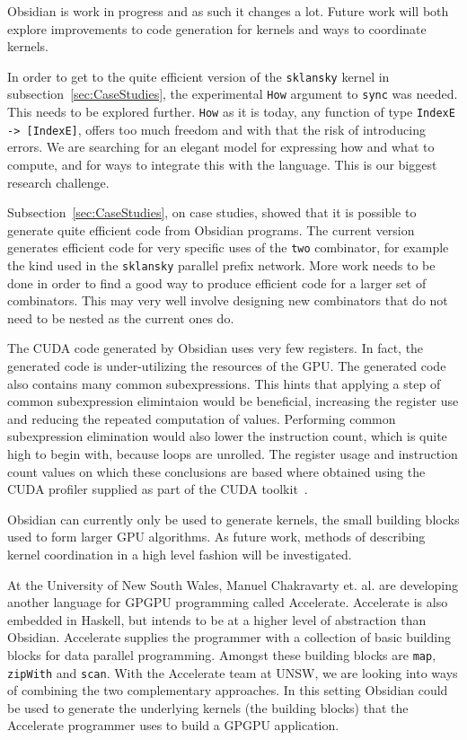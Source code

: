 Obsidian is work in progress and as such it changes a lot. Future work will both
explore improvements to code generation for kernels and ways to coordinate kernels.

In order to get to the quite efficient version of the {\tt sklansky} kernel 
in subsection~\ref{sec:CaseStudies}, the experimental {\tt How} argument to {\tt sync} was needed. 
This needs to be 
explored further. {\tt How} as it is today, any function of type
{\tt IndexE -> [IndexE]}, offers too much freedom and with that the risk of
introducing errors. We are searching for an elegant model for expressing how and what 
to compute, and for ways to integrate this with
the language. This is our biggest research challenge.

Subsection~\ref{sec:CaseStudies}, on case studies, showed that it is possible to
generate quite efficient code from Obsidian programs. The current version 
generates efficient code for very specific uses of the {\tt two} combinator, 
for example the kind used in the {\tt sklansky} parallel prefix network. More 
work needs to be done in order to find a good way to produce efficient code 
for a larger set of combinators. 
This may very well involve designing new combinators that do not need
to be nested as the current ones do.

The CUDA code generated by Obsidian uses very few registers. In fact,
the generated code is under-utilizing the resources of the GPU. The generated 
code also contains many common subexpressions. This hints that applying a 
step of common subexpression elimintaion would be beneficial, increasing 
the register use and reducing the repeated computation of values. Performing
common subexpression elimination would also lower the instruction count,
which is quite high to begin with, because loops are unrolled. 
The register usage and instruction count values on which these conclusions 
are based where obtained using the CUDA profiler supplied as part of the 
CUDA toolkit~.

Obsidian can currently only be used to generate kernels, the small 
building blocks used to form larger GPU algorithms. As future work, 
methods of describing kernel coordination in a high level fashion will 
be investigated.

At the University of New South Wales, Manuel Chakravarty 
et. al. are developing another language for GPGPU programming
called Accelerate. Accelerate is also embedded in Haskell, but intends
to be at a higher 
level of abstraction than Obsidian. Accelerate supplies the programmer 
with a collection of basic building blocks for data parallel programming. 
Amongst these building blocks are {\tt map}, {\tt zipWith} and {\tt scan}.
With the Accelerate team at UNSW, we are looking into 
ways of combining the two complementary approaches. In this setting Obsidian 
could be used to generate the underlying kernels (the building blocks) that the Accelerate 
programmer uses to build a GPGPU application. 

